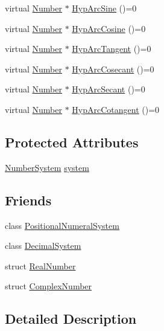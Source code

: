 \begin{DoxyCompactItemize}
virtual \hyperlink{structNumber}{Number} $\ast$ \hyperlink{structNumber_aab0a62427355e8139c6d853c7c7ef8d2}{Hyp\+Arc\+Sine} ()=0
\item 
virtual \hyperlink{structNumber}{Number} $\ast$ \hyperlink{structNumber_ae919ea5844a071f26f61a069055429ea}{Hyp\+Arc\+Cosine} ()=0
\item 
virtual \hyperlink{structNumber}{Number} $\ast$ \hyperlink{structNumber_aa1af1928e54054a73c43340fd5238299}{Hyp\+Arc\+Tangent} ()=0
\item 
virtual \hyperlink{structNumber}{Number} $\ast$ \hyperlink{structNumber_a161ee9528f4ba95e95e1310d840f7092}{Hyp\+Arc\+Cosecant} ()=0
\item 
virtual \hyperlink{structNumber}{Number} $\ast$ \hyperlink{structNumber_aa58d792da89672016b2f58beea9009d7}{Hyp\+Arc\+Secant} ()=0
\item 
virtual \hyperlink{structNumber}{Number} $\ast$ \hyperlink{structNumber_a41bd8f9dadae875b260ee4fe50280d3e}{Hyp\+Arc\+Cotangent} ()=0
\end{DoxyCompactItemize}
\subsection*{Protected Attributes}
\begin{DoxyCompactItemize}
\item 
\hyperlink{numb_8h_a1475a201d2346881ce88dfbacf628c7d}{Number\+System} \hyperlink{structNumber_a2ceda5601c42288626e76b06878e7476}{system}
\end{DoxyCompactItemize}
\subsection*{Friends}
\begin{DoxyCompactItemize}
\item 
class \hyperlink{structNumber_aeedc2a5f26536b10c3e3e505e4ddfb81}{Positional\+Numeral\+System}
\item 
class \hyperlink{structNumber_a78cb487a959b6767c06f83cb19aafc43}{Decimal\+System}
\item 
struct \hyperlink{structNumber_a405f5c7ef806c4c45a1de7647daa6306}{Real\+Number}
\item 
struct \hyperlink{structNumber_ae59451cc698db2f80a85244883578673}{Complex\+Number}
\end{DoxyCompactItemize}


\subsection{Detailed Description}


